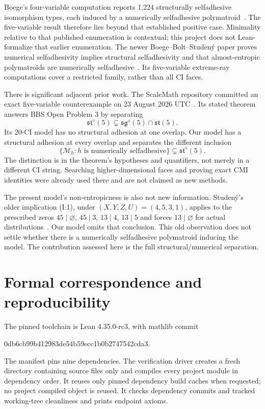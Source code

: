 \documentclass[11pt]{article}
\newcommand{\M}{\mathcal M}\newcommand{\st}{\mathfrak{st}}
\newcommand{\sg}{\mathfrak{sg}}\newcommand{\R}{\mathbb R}
\begin{document}
Boege's four-variable computation reports 1,224 structurally selfadhesive
isomorphism types, each induced by a numerically selfadhesive
polymatroid~\cite{Boege}. The five-variable result therefore lies beyond that
established positive case. Minimality relative to that published enumeration
is contextual; this project does not Lean-formalize that earlier enumeration.
The newer Boege--Bolt--Studen\'y paper proves numerical selfadhesivity implies
structural selfadhesivity and that almost-entropic polymatroids are numerically
selfadhesive~\cite[Lemma~8.2]{BBS}. Its five-variable extreme-ray computations
cover a restricted family, rather than all CI faces.

There is significant adjacent prior work. The ScaleMath repository committed
an exact five-variable counterexample on 23 August 2026 UTC~\cite{ScaleMath}.
Its stated theorem answers BBS Open Problem 3 by separating
\[
 \st^{\diamond}(5)\subsetneq\sg^{\diamond}(5)\cap\st(5).
\]
Its 20-CI model has no structural adhesion at one overlap. Our model has a
structural adhesion at every overlap and separates the different inclusion
\[
 \{\M_h:h\text{ is numerically selfadhesive}\}
 \subsetneq\st^{\diamond}(5).
\]
The distinction is in the theorem's hypotheses and quantifiers, not merely in
a different CI string. Searching higher-dimensional faces and proving exact
CMI identities were already used there and are not claimed as new methods.

The present model's non-entropicness is also not new information. Studen\'y's
older implication (I:1), under $(X,Y,Z,U)=(4,5,3,1)$, applies to the prescribed
zeros $45\mid\varnothing$, $45\mid3$, $13\mid4$, $13\mid5$ and forces
$13\mid\varnothing$ for actual distributions~\cite[Section~V.B]{Studeny}.
Our model omits that conclusion. This old observation does not settle whether
there is a numerically selfadhesive polymatroid inducing the model. The
contribution assessed here is the full structural/numerical separation.

\section{Formal correspondence and reproducibility}\label{sec:lean}
The pinned toolchain is Lean 4.35.0-rc3, with mathlib commit
\begin{center}\small\ttfamily 0db6cb99b412983de54b59ecc1b0b2747542cda3.\end{center}
The manifest pins nine dependencies. The verification driver creates a fresh
directory containing source files only and compiles every project module in
dependency order. It reuses only pinned dependency build caches when requested;
no project compiled object is reused. It checks dependency commits and tracked
working-tree cleanliness and prints endpoint axioms.
\end{document}

